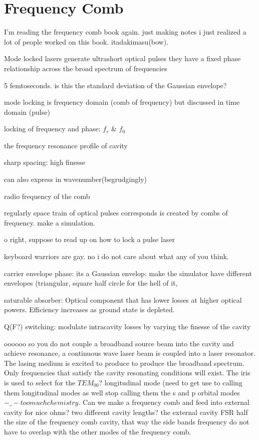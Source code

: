 \documentclass[11pt,a4paper]{book}
\begin{document}
\chapter{Frequency Comb}
I'm reading the frequency comb book again. just making notes
i just realized a lot of people worked on this book. itadakimasu(bow).

Mode locked lasers generate ultrashort optical pulses they have a fixed phase relationship across the broad spectrum of frequencies

5 femtoseconds. is this the standard deviation of the Gaussian envelope?

mode locking is frequency domain (comb of frequency) but discussed in time domain (pulse)

locking of frequency and phase: $f_r$ \& $f_0$

the frequency resonance profile of cavity

sharp spacing: high finesse

can also express in wavenumber(begrudgingly)

radio frequency of the comb

regularly space train of optical pulses corresponds is created by combs of frequency. make a simulation.

o right, suppose to read up on how to lock a pulse laser

keyboard warriors are gay. no i do not care about what any of you think.

carrier envelope phase: its a Gaussian envelop: make the simulator have different envelopes (triangular, square half circle for the hell of it,

saturable absorber: Optical component that has lower losses at higher optical powers. Efficiency increases as ground state is depleted.

Q(F?) switching: modulate intracavity losses by varying the finesse of the cavity

oooooo so you do not couple a broadband source beam into the cavity and achieve resonance, a continuous wave laser beam is coupled into a laser resonator. The lasing medium is excited to produce to produce the broadband spectrum. Only frequencies that satisfy the cavity resonating conditions will exist. The iris is used to select for the $TEM_{00}?$ longitudinal mode (need to get use to calling them longitudinal modes as well stop calling them the s and p orbital modes $-\_- too much chemistry$. Can we make a frequency comb and feed into external cavity for nice ohms? two different cavity lengths? the external cavity FSR half the size of the frequency comb cavity, that way the side bands frequency do not have to overlap with the other modes of the frequency comb. 
\end{document}
